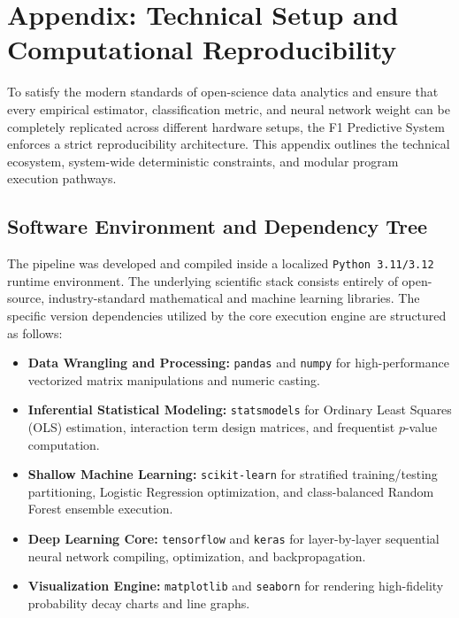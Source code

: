 \UseRawInputEncoding
\section{Appendix: Technical Setup and Computational Reproducibility}
\label{sec:appendix}

To satisfy the modern standards of open-science data analytics and ensure that every empirical estimator, classification metric, and neural network weight can be completely replicated across different hardware setups, the F1 Predictive System enforces a strict reproducibility architecture. This appendix outlines the technical ecosystem, system-wide deterministic constraints, and modular program execution pathways.

\subsection{Software Environment and Dependency Tree}
\label{subsec:software_env}

The pipeline was developed and compiled inside a localized \texttt{Python 3.11/3.12} runtime environment. The underlying scientific stack consists entirely of open-source, industry-standard mathematical and machine learning libraries. The specific version dependencies utilized by the core execution engine are structured as follows:
\begin{itemize}
    \item \textbf{Data Wrangling and Processing:} \texttt{pandas} and \texttt{numpy} for high-performance vectorized matrix manipulations and numeric casting.
    \item \textbf{Inferential Statistical Modeling:} \texttt{statsmodels} for Ordinary Least Squares (OLS) estimation, interaction term design matrices, and frequentist $p$-value computation.
    \item \textbf{Shallow Machine Learning:} \texttt{scikit-learn} for stratified training/testing partitioning, Logistic Regression optimization, and class-balanced Random Forest ensemble execution.
    \item \textbf{Deep Learning Core:} \texttt{tensorflow} and \texttt{keras} for layer-by-layer sequential neural network compiling, optimization, and backpropagation.
    \item \textbf{Visualization Engine:} \texttt{matplotlib} and \texttt{seaborn} for rendering high-fidelity probability decay charts and line graphs.
\end{itemize}

